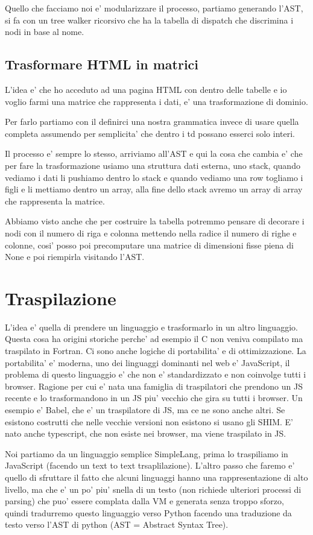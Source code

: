 Quello che facciamo noi e' modularizzare il processo, partiamo generando l'AST, si fa con un tree walker ricorsivo che ha la tabella di dispatch che discrimina i nodi in base al nome.

\subsection{Trasformare HTML in matrici}
L'idea e' che ho acceduto ad una pagina HTML con dentro delle tabelle e io voglio farmi una matrice che rappresenta i dati, e' una trasformazione di dominio.

Per farlo partiamo con il definirci una nostra grammatica invece di usare quella completa assumendo per semplicita' che dentro i td possano esserci solo interi.

Il processo e' sempre lo stesso, arriviamo all'AST e qui la cosa che cambia e' che per fare la trasformazione usiamo una struttura dati esterna, uno stack, quando vediamo i dati li pushiamo dentro lo stack e quando vediamo una row togliamo i figli e li mettiamo dentro un array, alla fine dello stack avremo un array di array che rappresenta la matrice.

Abbiamo visto anche che per costruire la tabella potremmo pensare di decorare i nodi con il numero di riga e colonna mettendo nella radice il numero di righe e colonne, cosi' posso poi precomputare una matrice di dimensioni fisse piena di None e poi riempirla visitando l'AST.

\section{Traspilazione}
L'idea e' quella di prendere un linguaggio e trasformarlo in un altro linguaggio. Questa cosa ha origini storiche perche' ad esempio il C non veniva compilato ma traspilato in Fortran. Ci sono anche logiche di portabilita' e di ottimizzazione. La portabilita' e' moderna, uno dei linguaggi dominanti nel web e' JavaScript, il problema di questo linguaggio e' che non e' standardizzato e non coinvolge tutti i browser. Ragione per cui e' nata una famiglia di traspilatori che prendono un JS recente e lo trasformandono in un JS piu' vecchio che gira su tutti i browser. Un esempio e' Babel, che e' un traspilatore di JS, ma ce ne sono anche altri. Se esistono costrutti che nelle vecchie versioni non esistono si usano gli SHIM. E' nato anche typescript, che non esiste nei browser, ma viene traspilato in JS.

Noi partiamo da un linguaggio semplice SimpleLang, prima lo traspiliamo in JavaScript (facendo un text to text trsaplilazione). L'altro passo che faremo e' quello di sfruttare il fatto che alcuni linguaggi hanno una rappresentazione di alto livello, ma che e' un po' piu' snella di un testo (non richiede ulteriori processi di parsing) che puo' essere complata dalla VM e generata senza troppo sforzo, quindi tradurremo questo linguaggio verso Python facendo una traduzione da testo verso l'AST di python (AST = Abstract Syntax Tree).

